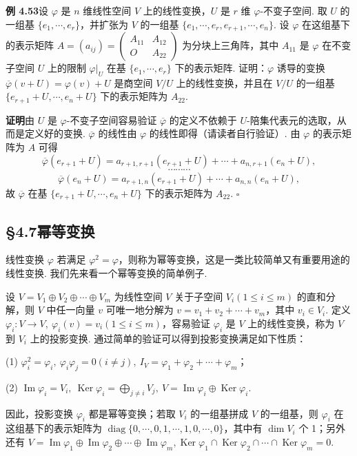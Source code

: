 \documentclass[UTF8, 12pt, fontset=fandol, oneside]{ctexart}
\begin{document}
\noindent\textbf{例 4.53}\quad 设 $\varphi$ 是 $n$ 维线性空间 $V$ 上的线性变换，$U$ 是 $r$ 维 $\varphi$-不变子空间. 取 $U$ 的一组基 $\{e_1,\cdots,e_r\}$，并扩张为 $V$ 的一组基 $\{e_1,\cdots,e_r,e_{r+1},\cdots,e_n\}$. 设 $\varphi$ 在这组基下的表示矩阵 $A=(a_{ij})=\left(\begin{array}{cc}A_{11}&A_{12}\\O&A_{22}\end{array}\right)$ 为分块上三角阵，其中 $A_{11}$ 是 $\varphi$ 在不变子空间 $U$ 上的限制 $\varphi|_U$ 在基 $\{e_1,\cdots,e_r\}$ 下的表示矩阵. 证明：$\varphi$ 诱导的变换 $\overline{\varphi}(v+U)=\varphi(v)+U$ 是商空间 $V/U$ 上的线性变换，并且在 $V/U$ 的一组基 $\{e_{r+1}+U,\cdots,e_n+U\}$ 下的表示矩阵为 $A_{22}$.

\noindent\textbf{证明}\quad 由 $U$ 是 $\varphi$-不变子空间容易验证 $\overline{\varphi}$ 的定义不依赖于 $U$-陪集代表元的选取，从而是定义好的变换. $\overline{\varphi}$ 的线性由 $\varphi$ 的线性即得（请读者自行验证）. 由 $\varphi$ 的表示矩阵为 $A$ 可得
\[
\overline{\varphi}(e_{r+1}+U)=a_{r+1,r+1}(e_{r+1}+U)+\cdots+a_{n,r+1}(e_n+U),
\]
\[
\cdots\cdots\cdots
\]
\[
\overline{\varphi}(e_n+U)=a_{r+1,n}(e_{r+1}+U)+\cdots+a_{n,n}(e_n+U),
\]
故 $\overline{\varphi}$ 在基 $\{e_{r+1}+U,\cdots,e_n+U\}$ 下的表示矩阵为 $A_{22}$. $\square$

\subsection*{§4.7\quad 幂等变换}

线性变换 $\varphi$ 若满足 $\varphi^2=\varphi$，则称为幂等变换，这是一类比较简单又有重要用途的线性变换. 我们先来看一个幂等变换的简单例子.

设 $V=V_1\oplus V_2\oplus\cdots\oplus V_m$ 为线性空间 $V$ 关于子空间 $V_i(1\le i\le m)$ 的直和分解，则 $V$ 中任一向量 $v$ 可唯一地分解为 $v=v_1+v_2+\cdots+v_m$，其中 $v_i\in V_i$. 定义 $\varphi_i:V\to V,\ \varphi_i(v)=v_i(1\le i\le m)$，容易验证 $\varphi_i$ 是 $V$ 上的线性变换，称为 $V$ 到 $V_i$ 上的投影变换. 通过简单的验证可以得到投影变换满足如下性质：

(1) $\varphi_i^2=\varphi_i,\ \varphi_i\varphi_j=0(i\ne j),\ I_V=\varphi_1+\varphi_2+\cdots+\varphi_m$；

(2) $\operatorname{Im}\varphi_i=V_i,\ \operatorname{Ker}\varphi_i=\bigoplus_{j\ne i}V_j,\ V=\operatorname{Im}\varphi_i\oplus\operatorname{Ker}\varphi_i$.

因此，投影变换 $\varphi_i$ 都是幂等变换；若取 $V_i$ 的一组基拼成 $V$ 的一组基，则 $\varphi_i$ 在这组基下的表示矩阵为 $\operatorname{diag}\{0,\cdots,0,1,\cdots,1,0,\cdots,0\}$，其中有 $\dim V_i$ 个 1；另外还有 $V=\operatorname{Im}\varphi_1\oplus\operatorname{Im}\varphi_2\oplus\cdots\oplus\operatorname{Im}\varphi_m,\operatorname{Ker}\varphi_1\cap\operatorname{Ker}\varphi_2\cap\cdots\cap\operatorname{Ker}\varphi_m=0$.
\end{document}

